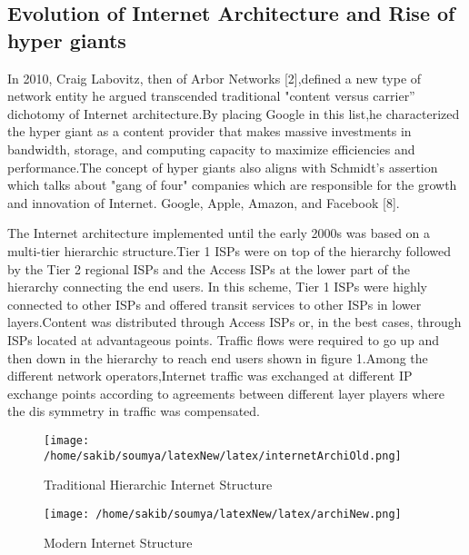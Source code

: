   
\subsection{Evolution of Internet Architecture and Rise of hyper giants}
In 2010, Craig Labovitz, then of Arbor Networks [2],defined a new type of network entity he argued transcended traditional "content versus carrier” dichotomy of Internet architecture.By placing Google in this list,he characterized the hyper giant as a content provider that makes massive investments in bandwidth, storage, and computing capacity to maximize efficiencies and performance.The concept of hyper giants also aligns with Schmidt’s assertion which talks about "gang of four" companies which are responsible for the growth and innovation of Internet. Google, Apple, Amazon, and Facebook [8].

The Internet architecture implemented until the early 2000s was based on a multi-tier hierarchic structure.Tier 1 ISPs were on top of the hierarchy followed by the Tier 2 regional ISPs and the Access ISPs at the lower part of the hierarchy connecting the end users. In this scheme, Tier 1 ISPs were highly connected to other ISPs and offered transit services to other ISPs in lower layers.Content was distributed through Access ISPs or, in the best cases, through ISPs located at advantageous points. Traffic flows were required to go up and then down in the hierarchy to reach end users shown in figure 1.Among the different network operators,Internet traffic was exchanged at different IP exchange points according to agreements between different layer players where the dis symmetry in traffic was compensated.

\begin{figure}[h]
\texttt{[image: /home/sakib/soumya/latexNew/latex/internetArchiOld.png]}
\centering
\caption{Traditional Hierarchic Internet Structure}
\end{figure}

\begin{figure}[h]
\texttt{[image: /home/sakib/soumya/latexNew/latex/archiNew.png]}
\centering
\caption{Modern Internet Structure}
\end{figure}

